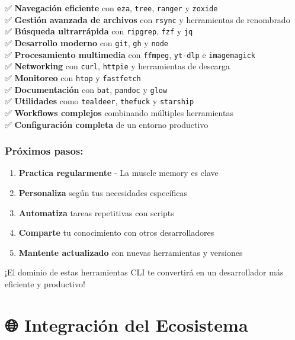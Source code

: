 \documentclass[
  11pt,
  letterpaper,
  oneside,
  openany]{scrbook}
\providecommand{\tightlist}{%
  \setlength{\itemsep}{0pt}\setlength{\parskip}{0pt}}
\begin{document}
✅ \textbf{Navegación eficiente} con \texttt{eza}, \texttt{tree},
\texttt{ranger} y \texttt{zoxide}\\
✅ \textbf{Gestión avanzada de archivos} con \texttt{rsync} y
herramientas de renombrado\\
✅ \textbf{Búsqueda ultrarrápida} con \texttt{ripgrep}, \texttt{fzf} y
\texttt{jq}\\
✅ \textbf{Desarrollo moderno} con \texttt{git}, \texttt{gh} y
\texttt{node}\\
✅ \textbf{Procesamiento multimedia} con \texttt{ffmpeg},
\texttt{yt-dlp} e \texttt{imagemagick}\\
✅ \textbf{Networking} con \texttt{curl}, \texttt{httpie} y herramientas
de descarga\\
✅ \textbf{Monitoreo} con \texttt{htop} y \texttt{fastfetch}\\
✅ \textbf{Documentación} con \texttt{bat}, \texttt{pandoc} y
\texttt{glow}\\
✅ \textbf{Utilidades} como \texttt{tealdeer}, \texttt{thefuck} y
\texttt{starship}\\
✅ \textbf{Workflows complejos} combinando múltiples herramientas\\
✅ \textbf{Configuración completa} de un entorno productivo

\subsection{Próximos pasos:}\label{pruxf3ximos-pasos-1}

\begin{enumerate}
\def\labelenumi{\arabic{enumi}.}
\tightlist
\item
  \textbf{Practica regularmente} - La muscle memory es clave
\item
  \textbf{Personaliza} según tus necesidades específicas
\item
  \textbf{Automatiza} tareas repetitivas con scripts
\item
  \textbf{Comparte} tu conocimiento con otros desarrolladores
\item
  \textbf{Mantente actualizado} con nuevas herramientas y versiones
\end{enumerate}

¡El dominio de estas herramientas CLI te convertirá en un desarrollador
más eficiente y productivo! 🚀

\chapter{🌐 Integración del
Ecosistema}\label{integraciuxf3n-del-ecosistema-1}
\end{document}
